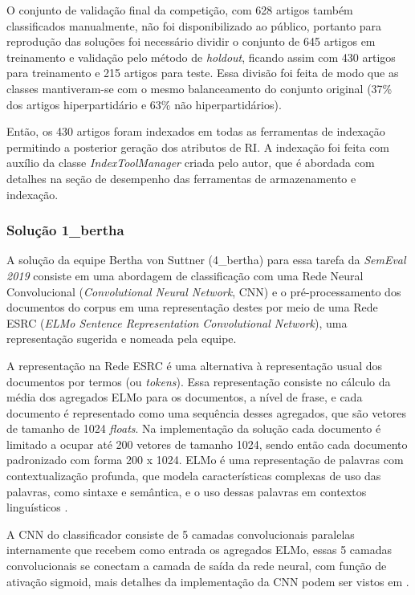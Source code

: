 			O conjunto de validação final da competição, com 628 artigos também classificados manualmente, não foi disponibilizado ao público, portanto para reprodução das soluções foi necessário dividir o conjunto de 645 artigos em treinamento e validação pelo método de \textit{holdout}, ficando assim com 430 artigos para treinamento e 215 artigos para teste. 
			Essa divisão foi feita de modo que as classes mantiveram-se com o mesmo balanceamento do conjunto original (37\% dos artigos hiperpartidário e 63\% não hiperpartidários).

			Então, os 430 artigos foram indexados em todas as ferramentas de indexação permitindo a posterior geração dos atributos de RI.
			A indexação foi feita com auxílio da classe \textit{IndexToolManager} criada pelo autor, que é abordada com detalhes na seção de desempenho das ferramentas de armazenamento e indexação.
			
			\subsubsection{Solução 1\_bertha}
				A solução da equipe Bertha von Suttner (4\_bertha) para essa tarefa da \textit{SemEval 2019} consiste em uma abordagem de classificação com uma Rede Neural Convolucional (\textit{Convolutional Neural Network}, CNN) e o pré-processamento dos documentos do corpus em uma representação destes por meio de uma Rede ESRC (\textit{ELMo Sentence Representation Convolutional Network}), uma representação sugerida e nomeada pela equipe.

				A representação na Rede ESRC é uma alternativa à representação usual dos documentos por termos (ou \textit{tokens}).
				Essa representação consiste no cálculo da média dos agregados ELMo para os documentos, a nível de frase, e cada documento é representado como uma sequência desses agregados, que são vetores de tamanho de 1024 \textit{floats}. 
				Na implementação da solução cada documento é limitado a ocupar até 200 vetores de tamanho 1024, sendo então cada documento padronizado com forma 200 x 1024.
				ELMo é uma representação de palavras com contextualização profunda, que modela características complexas de uso das palavras, como sintaxe e semântica, e o uso dessas palavras em contextos linguísticos \cite{ELMoDBLP:journals/corr/abs-1802-05365}.

				A CNN do classificador consiste de 5 camadas convolucionais paralelas internamente que recebem como entrada os agregados ELMo, essas 5 camadas convolucionais se conectam a camada de saída da rede neural, com função de ativação sigmoid, mais detalhes da implementação da CNN podem ser vistos em .

